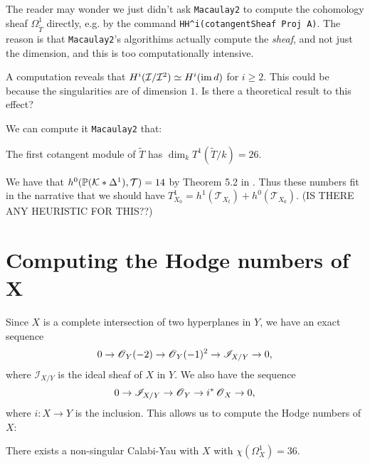 \documentclass[11pt, english]{article}
\begin{document}
\begin{remark}
 The reader may wonder we just didn't ask \verb|Macaulay2| to compute the cohomology sheaf $\Omega_{\widetilde T}^1$ directly, e.g. by the command \verb|HH^i(cotangentSheaf Proj A)|. The reason is that \verb|Macaulay2|'s algorithims actually compute the \emph{sheaf}, and not just the dimension, and this is too computationally intensive.
\end{remark}

\begin{remark}[Question]
A computation reveals that $H^i(\mathcal I/\mathcal I^2) \simeq H^i(\operatorname{im} d)$ for $ i\geq 2$. This could be because the singularities are of dimension $1$. Is there a theoretical result to this effect?
\end{remark}

We can compute it \verb|Macaulay2| that:
\begin{lemma}
The first cotangent module of $\widetilde T$ has $\dim_k T^1(\widetilde T/k) = 26$. 
\end{lemma}

We have that $h^0(\mathbb{P}(\mathcal K \ast \Delta^1),\mathcal T)=14$ by Theorem 5.2 in \cite{deforming_christophersen}. Thus these numbers fit in the narrative that we should have $T^1_{X_0} = h^1(\mathcal T_{X_t}) + h^0(\mathcal T_{X_0})$. (IS THERE ANY HEURISTIC FOR THIS??)

\section{Computing the Hodge numbers of X}

Since $X$ is a complete intersection of two hyperplanes in $Y$, we have an exact sequence
\[
0 \to \operatorname{\mathscr{O}}_Y(-2) \to \operatorname{\mathscr{O}}_Y(-1)^2 \to \mathscr I_{X/Y} \to 0,
\]
where $\mathscr I_{X/Y}$ is the ideal sheaf of $X$ in $Y$. We also have the sequence
\begin{equation}
\label{eqox}
0 \to \mathscr I_{X/Y} \to \operatorname{\mathscr{O}}_Y \to i^\ast \operatorname{\mathscr{O}}_X \to 0,  
\end{equation}
where $i:X \to Y$ is the inclusion. This allows us to compute the Hodge numbers of $X$:

\begin{thm}
There exists a non-singular Calabi-Yau with $X$ with $\chi(\Omega_X^1)=36$. 
\end{thm}
\end{document}
